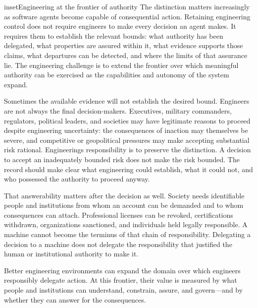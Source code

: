 \begin{bookbox}{inset}{Engineering at the frontier of authority}
The distinction matters increasingly as software agents become capable of consequential action. Retaining engineering control does not require engineers to make every decision an agent makes. It requires them to establish the relevant bounds: what authority has been delegated, what properties are assured within it, what evidence supports those claims, what departures can be detected, and where the limits of that assurance lie. The engineering challenge is to extend the frontier over which meaningful authority can be exercised as the capabilities and autonomy of the system expand.

Sometimes the available evidence will not establish the desired bound. Engineers are not always the final decision-makers. Executives, military commanders, regulators, political leaders, and societies may have legitimate reasons to proceed despite engineering uncertainty: the consequences of inaction may themselves be severe, and competitive or geopolitical pressures may make accepting substantial risk rational. Engineering\textquotesingle s responsibility is to preserve the distinction. A decision to accept an inadequately bounded risk does not make the risk bounded. The record should make clear what engineering could establish, what it could not, and who possessed the authority to proceed anyway.

That answerability matters after the decision as well. Society needs identifiable people and institutions from whom an account can be demanded and to whom consequences can attach. Professional licenses can be revoked, certifications withdrawn, organizations sanctioned, and individuals held legally responsible. A machine cannot become the terminus of that chain of responsibility. Delegating a decision to a machine does not delegate the responsibility that justified the human or institutional authority to make it.

Better engineering environments can expand the domain over which engineers responsibly delegate action. At this frontier, their value is measured by what people and institutions can understand, constrain, assure, and govern---and by whether they can answer for the consequences.
\end{bookbox}
